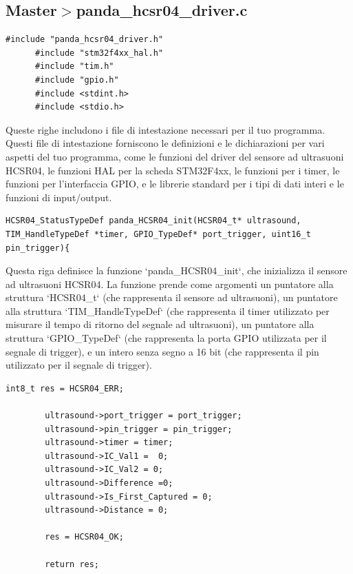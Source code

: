 \documentclass{article}
\begin{document}
    \subsection{Master$>$panda\_hcsr04\_driver.c}
    \begin{lstlisting}[style=CStyle]
      #include "panda_hcsr04_driver.h"
      #include "stm32f4xx_hal.h"
      #include "tim.h"
      #include "gpio.h"
      #include <stdint.h>
      #include <stdio.h>
      \end{lstlisting}
      
      Queste righe includono i file di intestazione necessari per il tuo programma. Questi file di intestazione forniscono le definizioni e le dichiarazioni per vari aspetti del tuo programma, come le funzioni del driver del sensore ad ultrasuoni HCSR04, le funzioni HAL per la scheda STM32F4xx, le funzioni per i timer, le funzioni per l'interfaccia GPIO, e le librerie standard per i tipi di dati interi e le funzioni di input/output.
      
      \begin{lstlisting}[style=CStyle]
      HCSR04_StatusTypeDef panda_HCSR04_init(HCSR04_t* ultrasound, TIM_HandleTypeDef *timer, GPIO_TypeDef* port_trigger, uint16_t pin_trigger){
      \end{lstlisting}
      
      Questa riga definisce la funzione `panda\_HCSR04\_init`, che inizializza il sensore ad ultrasuoni HCSR04. La funzione prende come argomenti un puntatore alla struttura `HCSR04\_t` (che rappresenta il sensore ad ultrasuoni), un puntatore alla struttura `TIM\_HandleTypeDef` (che rappresenta il timer utilizzato per misurare il tempo di ritorno del segnale ad ultrasuoni), un puntatore alla struttura `GPIO\_TypeDef` (che rappresenta la porta GPIO utilizzata per il segnale di trigger), e un intero senza segno a 16 bit (che rappresenta il pin utilizzato per il segnale di trigger).
      
      \begin{lstlisting}[style=CStyle]
        int8_t res = HCSR04_ERR;
      
        ultrasound->port_trigger = port_trigger;
        ultrasound->pin_trigger = pin_trigger;
        ultrasound->timer = timer;
        ultrasound->IC_Val1 =  0;
        ultrasound->IC_Val2 = 0;
        ultrasound->Difference =0;
        ultrasound->Is_First_Captured = 0;
        ultrasound->Distance = 0;
      
        res = HCSR04_OK;
      
        return res;
      \end{lstlisting}
      
\end{document}
